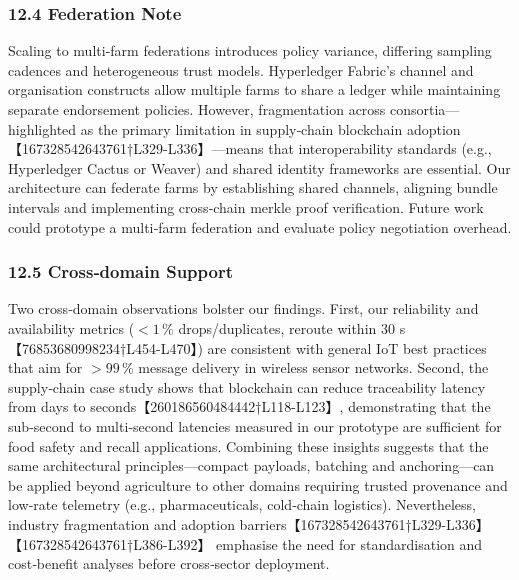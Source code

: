 \documentclass[12pt,onecolumn]{IEEEtran} %
\begin{document}
\subsubsection*{12.4 Federation Note}
Scaling to multi‑farm federations introduces policy variance, differing sampling cadences and heterogeneous trust models.  Hyperledger Fabric’s channel and organisation constructs allow multiple farms to share a ledger while maintaining separate endorsement policies.  However, fragmentation across consortia—highlighted as the primary limitation in supply‑chain blockchain adoption【167328542643761†L329-L336】—means that interoperability standards (e.g., Hyperledger Cactus or Weaver) and shared identity frameworks are essential.  Our architecture can federate farms by establishing shared channels, aligning bundle intervals and implementing cross‑chain merkle proof verification.  Future work could prototype a multi‑farm federation and evaluate policy negotiation overhead.

\subsubsection*{12.5 Cross‑domain Support}
Two cross‑domain observations bolster our findings.  First, our reliability and availability metrics (\(<1\,\%\) drops/duplicates, reroute within 30 s【76853680998234†L454-L470】) are consistent with general IoT best practices that aim for \(>99\,\%\) message delivery in wireless sensor networks.  Second, the supply‑chain case study shows that blockchain can reduce traceability latency from days to seconds【260186560484442†L118-L123】, demonstrating that the sub‑second to multi‑second latencies measured in our prototype are sufficient for food safety and recall applications.  Combining these insights suggests that the same architectural principles—compact payloads, batching and anchoring—can be applied beyond agriculture to other domains requiring trusted provenance and low‑rate telemetry (e.g., pharmaceuticals, cold‑chain logistics).  Nevertheless, industry fragmentation and adoption barriers【167328542643761†L329-L336】【167328542643761†L386-L392】 emphasise the need for standardisation and cost‑benefit analyses before cross‑sector deployment.
\end{document}
